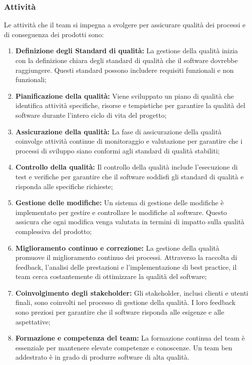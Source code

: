 \subsubsection{Attività}
Le attività che il team si impegna a svolgere per assicurare qualità dei processi e di conseguenza dei prodotti sono:
\begin{enumerate}
    \item \textbf{Definizione degli Standard di qualità:} La gestione della qualità inizia con la definizione chiara degli standard di qualità che il software dovrebbe raggiungere. Questi standard possono includere requisiti funzionali e non funzionali;

    \item \textbf{Pianificazione della qualità:} Viene sviluppato un piano di qualità che identifica attività specifiche, risorse e tempistiche per garantire la qualità del software durante l'intero ciclo di vita del progetto;

    \item \textbf{Assicurazione della qualità:} La fase di assicurazione della qualità coinvolge attività continue di monitoraggio e valutazione per garantire che i processi di sviluppo siano conformi agli standard di qualità stabiliti;

    \item \textbf{Controllo della qualità:} Il controllo della qualità include l'esecuzione di test e verifiche per garantire che il software soddisfi gli standard di qualità e risponda alle specifiche richieste;

    \item \textbf{Gestione delle modifiche:} Un sistema di gestione delle modifiche è implementato per gestire e controllare le modifiche al software. Questo assicura che ogni modifica venga valutata in termini di impatto sulla qualità complessiva del prodotto;

    \item \textbf{Miglioramento continuo e correzione:} La gestione della qualità promuove il miglioramento continuo dei processi. Attraverso la raccolta di feedback, l'analisi delle prestazioni e l'implementazione di best practice, il team cerca costantemente di ottimizzare la qualità del software;

    \item \textbf{Coinvolgimento degli stakeholder:} Gli stakeholder, inclusi clienti e utenti finali, sono coinvolti nel processo di gestione della qualità. I loro feedback sono preziosi per garantire che il software risponda alle esigenze e alle aspettative;

    \item \textbf{Formazione e competenza del team:} La formazione continua del team è essenziale per mantenere elevate competenze e conoscenze. Un team ben addestrato è in grado di produrre software di alta qualità.
\end{enumerate}


